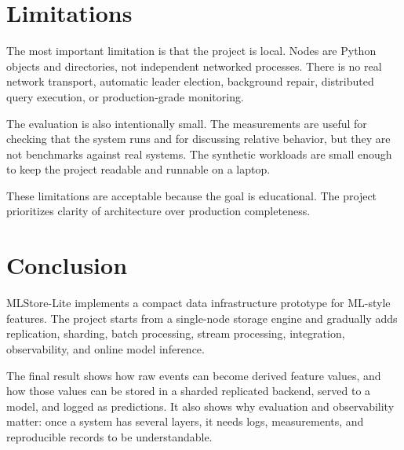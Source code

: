 \section{Limitations}

The most important limitation is that the project is local. Nodes are Python
objects and directories, not independent networked processes. There is no real
network transport, automatic leader election, background repair, distributed
query execution, or production-grade monitoring.

The evaluation is also intentionally small. The measurements are useful for
checking that the system runs and for discussing relative behavior, but they are
not benchmarks against real systems. The synthetic workloads are small enough to
keep the project readable and runnable on a laptop.

These limitations are acceptable because the goal is educational. The project
prioritizes clarity of architecture over production completeness.

\section{Conclusion}

MLStore-Lite implements a compact data infrastructure prototype for ML-style
features. The project starts from a single-node storage engine and gradually
adds replication, sharding, batch processing, stream processing, integration,
observability, and online model inference.

The final result shows how raw events can become derived feature values, and how
those values can be stored in a sharded replicated backend, served to a model,
and logged as predictions. It also shows why evaluation and observability
matter: once a system has several layers, it needs logs, measurements, and
reproducible records to be understandable.
